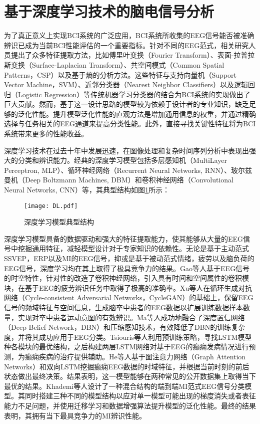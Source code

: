\section{基于深度学习技术的脑电信号分析}
为了真正意义上实现BCI系统的广泛应用，BCI系统所收集的EEG信号能否被准确辨识已成为当前BCI性能评估的一个重要指标。针对不同的EEG范式，相关研究人员提出了众多特征提取方法，比如傅里叶变换（Fourier Transform）、表面-拉普拉斯变换（Surface-Laplacian Transform）、共空间模式（Common Spatial Patterns，CSP）以及基于熵的分析方法\cite{1-56, 1-57, 1-58, 3-11}。这些特征与支持向量机（Support Vector Machine，SVM）、近邻分类器（Nearest Neighbor Classifiers）以及逻辑回归（Logistic Regression）等传统机器学习分类器的结合为BCI系统的实现做出了巨大贡献\cite{1-59,1-60,1-61}。然而，基于这一设计思路的模型较为依赖于设计者的专业知识，缺乏足够的泛化性能。提升模型泛化性能的直观方法是增加通用信息的权重，并通过精确选择与任务相关的EEG通道来提高分类性能\cite{1-62}。此外，直接寻找关键性特征将为BCI系统带来更多的性能收益\cite{1-63}。

深度学习技术在过去十年中发展迅速，在图像处理和复杂时间序列分析中表现出强大的分类和辨识能力\cite{1-64}。经典的深度学习模型包括多层感知机（MultiLayer Perceptron, MLP）\cite{1-68}、循环神经网络（Recurrent Neural Networks, RNN）\cite{1-69}、玻尔兹曼机（Deep Boltzmann Machines, DBM）\cite{1-70}和卷积神经网络（Convolutional Neural Networks, CNN）\cite{3-21}等，其典型结构如图\ref{fig1-8}所示：

\begin{figure}[!h]
	\centering
	\texttt{[image: DL.pdf]}
	\caption{深度学习模型典型结构}
	\label{fig1-8}
\end{figure}

深度学习模型具备的数据驱动和强大的特征提取能力，使其能够从大量的EEG信号中挖掘通用特征，减轻模型设计对于专家知识的依赖性。无论是基于主动范式SSVEP，ERP以及MI的EEG信号，抑或是基于被动范式情绪，疲劳以及脑负荷的EEG信号，深度学习均在其上取得了极具竞争力的结果\cite{1-66,1-67}。Gao等人\cite{1-65}基于EEG信号的时空特性，针对性的改造了卷积神经网络，引入具有时间和空间属性的卷积模块，在基于EEG的疲劳辨识任务中取得了极高的准确率。Xu等人\cite{1-71}在循环生成对抗网络（Cycle-consistent Adversarial Networks，CycleGAN）的基础上，保留EEG信号的频域特征与空间信息，生成脑卒中患者的EEG数据以扩展训练数据样本数量，实现对卒中患者运动意图的有效辨识。Ma等人\cite{1-72}成功地融合了深度置信网络（Deep Belief Network，DBN）和压缩感知技术，有效降低了DBN的训练复杂度，并将其成功应用于EEG分类。Tsiouris等人\cite{1-73}利用预训练策略，寻找LSTM模型种各模块的最优结构，之后构建两层LSTM网络对基于EEG的癫痫发病情况进行预测，为癫痫疾病的治疗提供辅助。He等人\cite{1-74}基于图注意力网络（Graph Attention Networks）和双向LSTM挖掘癫痫EEG数据的时域特征，并根据当前时刻的前后状态做出最终决策。结果表明，这一模型能够在两种常见的公开数据集上取得当下最优的结果。Khademi等人\cite{1-75}设计了一种混合结构的端到端MI范式EEG信号分类模型。其同时搭建三种不同的模型结构以应对单一模型可能出现的梯度消失或者表征能力不足问题，并使用迁移学习和数据增强算法提升模型的泛化性能。最终的结果表明，其拥有当下最具竞争力的MI辨识性能。

